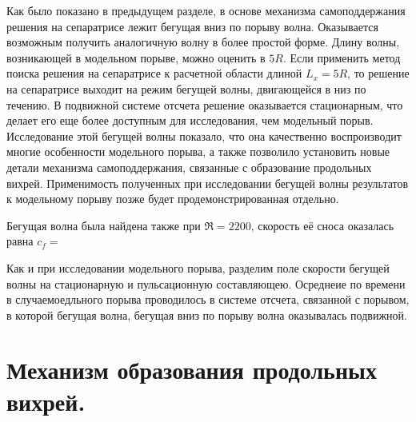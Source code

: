 Как было показано в предыдущем разделе, в основе механизма самоподдержания решения на сепаратрисе лежит бегущая вниз по порыву волна. Оказывается возможным получить аналогичную волну в более простой форме. Длину волны, возникающей в модельном порыве, можно оценить в $5R$. Если применить метод поиска решения на сепаратрисе к расчетной области длиной $L_x = 5R$, то решение на сепаратрисе выходит на режим бегущей волны, двигающейся в низ по течению. В подвижной системе отсчета решение оказывается стационарным, что делает его еще более доступным для исследования, чем модельный порыв. Исследование этой бегущей волны показало, что она качественно воспроизводит многие особенности модельного порыва, а также позволило установить новые детали механизма самоподдержания, связанные с образование продольных вихрей. Применимость полученных при исследовании бегущей волны результатов к модельному порыву позже будет продемонстрированная отдельно. 


Бегущая волна была найдена также при $\Re = 2200$, скорость её сноса оказалась равна $c_f = $

Как и при исследовании модельного порыва, разделим поле скорости бегущей волны на стационарную и пульсационную составляющею. Осреднеие по времени в случаемоедльного порыва проводилось в системе отсчета, связанной с порывом, в которой бегущая волна, бегущая вниз по порыву волна оказывалась подвижной. 

\section{Механизм образования продольных вихрей.}

